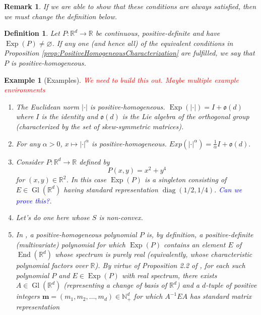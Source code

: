 \documentclass[11pt]{article}
\theoremstyle{theorem}
\newtheorem{definition}[theorem]{Definition}
\newtheorem{remark}{Remark}
\newtheorem{example}{Example}
\newcommand\End{\operatorname{End}} %
\newcommand\Gl{\operatorname{Gl}}                     %
\newcommand\Exp{\operatorname{Exp}}
\newcommand\diag{\operatorname{diag}}
\begin{document}
\begin{remark}
If we are able to show that these conditions are always satisfied, then we must change the definition below. 
\end{remark}
\textcolor{red}{\hline}

\begin{definition}
Let $P:\mathbb{R}^d\to\mathbb{R}$ be continuous, positive-definite and have $\Exp(P)\neq \varnothing$. If any one (and hence all) of the equivalent conditions in Proposition \ref{prop:PositiveHomogeneousCharacterization} are fulfilled, we say that $P$ is positive-homogeneous.
\end{definition}
\begin{example}[Examples]
\textcolor{red}{We need to build this out. Maybe multiple example environments}
\begin{enumerate}
\item The Euclidean norm $|\cdot|$ is positive-homogeneous. $\Exp(|\cdot|)=I+\mathfrak{o}(d)$ where $I$ is the identity and $\mathfrak{o}(d)$ is the Lie algebra of the orthogonal group (characterized by the set of skew-symmetric matrices).
\item For any $\alpha>0$, $x\mapsto |\cdot|^\alpha$ is positive-homogeneous. $Exp(|\cdot|^{\alpha})=\frac{1}{\alpha}I+\mathfrak{o}(d).$
\item Consider $P:\mathbb{R}^d\to \mathbb{R}$ defined by
\begin{equation*}
P(x,y)=x^2+y^4
\end{equation*}
for $(x,y)\in\mathbb{R}^2$. In this case $\Exp(P)$ is a singleton consisting of $E\in\Gl(\mathbb{R}^d)$ having standard representation $\diag(1/2,1/4)$. \textcolor{blue}{Can we prove this?}.
\item Let's do one here whose $S$ is non-convex.
\item In \cite{Randles2017}, a positive-homogeneous polynomial $P$ is, by definition, a positive-definite (multivariate) polynomial for which $\Exp(P)$ contains an element $E$ of $\End(\mathbb{R}^d)$ whose spectrum is purely real (equivalently, whose characteristic polynomial factors over $\mathbb{R}$). By virtue of Proposition 2.2 of \cite{Randles2017}, for each such polynomial $P$ and $E\in\Exp(P)$ with real spectrum, there exists $A\in\Gl(\mathbb{R}^d)$ (representing a change of basis of $\mathbb{R}^d$) and a $d$-tuple of positive integers $\mathbf{m}=(m_1,m_2,\dots,m_d)\in\mathbb{N}_+^d$ for which $A^{-1}EA$ has standard matrix representation
\begin{equation}\label{eq:DiagonalizableE}

\end{equation}
\end{enumerate}
\end{example}
\end{document}

